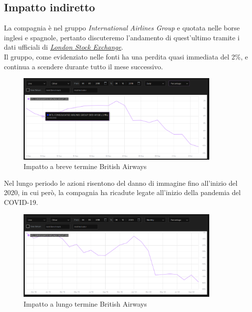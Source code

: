 \documentclass[12pt,a4paper,openright,twoside]{report}
\begin{document}
\subsection{Impatto indiretto}
La compagnia \`e nel gruppo \textit{International Airlines Group} e quotata nelle borse inglesi e spagnole, pertanto discuteremo l'andamento di quest'ultimo tramite i dati ufficiali di \href{https://www.londonstockexchange.com/stock/}{\textit{London Stock Exchange}}.\\
Il gruppo, come evidenziato nelle fonti\cite{BritAir} ha una perdita quasi immediata del 2\%, e continua a scendere durante tutto il mese successivo.

\begin{figure}[H] 
\begin{center} 
\includegraphics[width=10cm]{figures/britAir_short.png} 
\caption[Grafico British Airways short]{Impatto a breve termine British Airways}\label{fig:britair1}
\end{center}
\end{figure}

Nel lungo periodo le azioni risentono del danno di immagine fino all'inizio del 2020, in cui per\`o, la compagnia ha ricadute legate all'inizio della pandemia del COVID-19.\\

\begin{figure}[H] 
\begin{center} 
\includegraphics[width=10cm]{figures/britAir_long.png} 
\caption[Grafico British Airways long]{Impatto a lungo termine  British Airways}\label{fig:britair2}
\end{center}
\end{figure}
\end{document}

